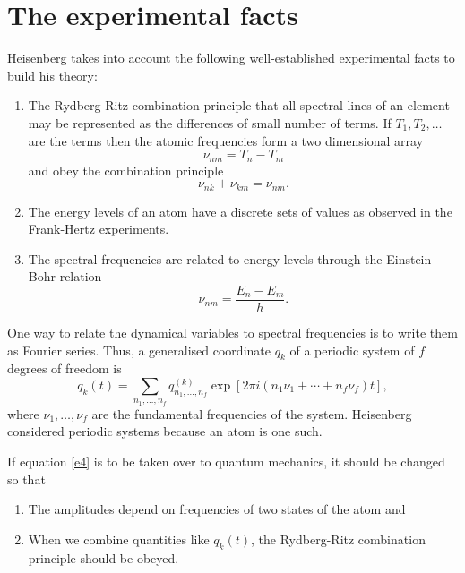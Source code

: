 \documentclass{article}
\begin{document}
\section{The experimental facts}
Heisenberg takes into account the following well-established experimental facts
to build his theory:
\begin{enumerate}
\item The Rydberg-Ritz combination principle that all spectral lines of an
element may be represented as the differences of small number of terms. If
$T_1, T_2, \ldots$ are the terms then the atomic frequencies form a two
dimensional array
\begin{equation}\label{e1}
\nu_{nm} = T_n - T_m
\end{equation}
and obey the combination principle
\begin{equation}\label{e2}
\nu_{nk} + \nu_{km} = \nu_{nm}.
\end{equation}
\item The energy levels of an atom have a discrete sets of values as observed
in the Frank-Hertz experiments.
\item The spectral frequencies are related to energy levels through the 
Einstein-Bohr relation
\begin{equation}\label{e3}
\nu_{nm} = \frac{E_n - E_m}{h}.
\end{equation}
\end{enumerate}

One way to relate the dynamical variables to spectral frequencies is to write
them as Fourier series. Thus, a generalised coordinate $q_k$ of a periodic 
system of $f$ degrees of freedom is
\begin{equation}\label{e4}
q_k(t)=\sum_{n_1, \ldots, n_f}q^{(k)}_{n_1, \ldots, n_f}\exp[2\pi i(n_1\nu_1 +
\cdots + n_f\nu_f)t],
\end{equation}
where $\nu_1, \ldots, \nu_f$ are the fundamental frequencies of the system.
Heisenberg considered periodic systems because an atom is one such.

If equation \eqref{e4} is to be taken over to quantum mechanics, it should
be changed so that
\begin{enumerate}
\item The amplitudes depend on frequencies of two states of the atom and
\item When we combine quantities like $q_k(t)$, the Rydberg-Ritz combination
principle should be obeyed.
\end{enumerate}
\end{document}

